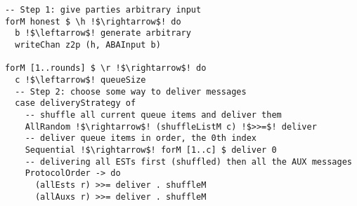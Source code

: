 \begin{lstlisting}
-- Step 1: give parties arbitrary input
forM honest $ \h !$\rightarrow$! do
  b !$\leftarrow$! generate arbitrary
  writeChan z2p (h, ABAInput b)

forM [1..rounds] $ \r !$\rightarrow$! do
  c !$\leftarrow$! queueSize
  -- Step 2: choose some way to deliver messages
  case deliveryStrategy of
  	-- shuffle all current queue items and deliver them
    AllRandom !$\rightarrow$! (shuffleListM c) !$>>=$! deliver
	-- deliver queue items in order, the 0th index
    Sequential !$\rightarrow$! forM [1..c] $ deliver 0
	-- delivering all ESTs first (shuffled) then all the AUX messages
    ProtocolOrder -> do
      (allEsts r) >>= deliver . shuffleM
      (allAuxs r) >>= deliver . shuffleM
\end{lstlisting}

